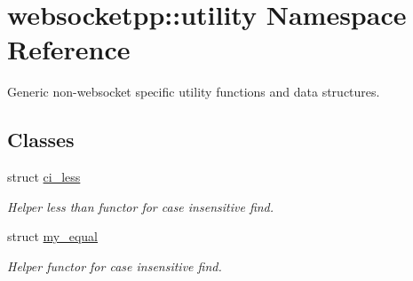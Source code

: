 \hypertarget{namespacewebsocketpp_1_1utility}{}\section{websocketpp\+:\+:utility Namespace Reference}
\label{namespacewebsocketpp_1_1utility}


Generic non-\/websocket specific utility functions and data structures.  


\subsection*{Classes}
\begin{DoxyCompactItemize}
\item 
struct \mbox{\hyperlink{structwebsocketpp_1_1utility_1_1ci__less}{ci\+\_\+less}}
\begin{DoxyCompactList}\small\item\em Helper less than functor for case insensitive find. \end{DoxyCompactList}\item 
struct \mbox{\hyperlink{structwebsocketpp_1_1utility_1_1my__equal}{my\+\_\+equal}}
\begin{DoxyCompactList}\small\item\em Helper functor for case insensitive find. \end{DoxyCompactList}\end{DoxyCompactItemize}
